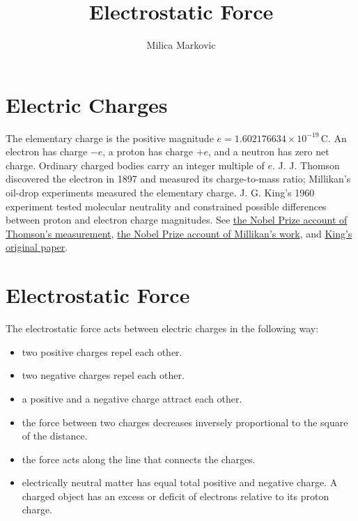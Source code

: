 \documentclass{ximera}
\title{Electrostatic Force}
\author{Milica Markovic}
\begin{document}
  
\begin{abstract}  

\end{abstract}  
\maketitle    



\section{Electric Charges}
The elementary charge is the positive magnitude $e=1.602176634\times10^{-19}\,\mathrm{C}$. An electron has charge $-e$, a proton has charge $+e$, and a neutron has zero net charge. Ordinary charged bodies carry an integer multiple of $e$. J. J. Thomson discovered the electron in 1897 and measured its charge-to-mass ratio; Millikan's oil-drop experiments measured the elementary charge. J. G. King's 1960 experiment tested molecular neutrality and constrained possible differences between proton and electron charge magnitudes.
See \href{https://educationalgames.nobelprize.org/educational/physics/vacuum/experiment-1.html}{the Nobel Prize account of Thomson's measurement}, \href{https://www.nobelprize.org/prizes/physics/1923/millikan/facts/}{the Nobel Prize account of Millikan's work}, and \href{https://doi.org/10.1103/PhysRevLett.5.562}{King's original paper}.



\section{Electrostatic Force}

The electrostatic force acts between electric charges in the following way:

\begin{itemize}
\item two positive charges repel each other.
\item two negative charges repel each other.
\item a positive and a negative charge attract each other.
\item the force between two charges decreases inversely proportional to the square of the distance.
\item the force acts along the line that connects the charges.
\item electrically neutral matter has equal total positive and negative charge. A charged object has an excess or deficit of electrons relative to its proton charge.
\end{itemize}
 
\end{document}
